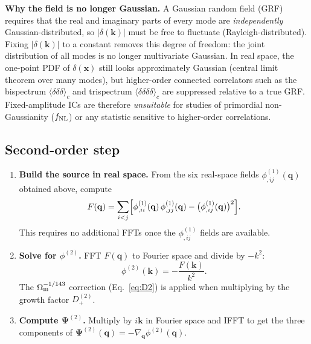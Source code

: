 \documentclass[12pt]{article}
\newcommand{\bq}{\mathbf{q}}
\newcommand{\bx}{\mathbf{x}}
\newcommand{\bk}{\mathbf{k}}
\newcommand{\bPsi}{\boldsymbol{\Psi}}
\newcommand{\Dpp}{D_+^{(2)}}
\newcommand{\Omm}{\Omega_{\rm m}}
\begin{document}
\begin{tcolorbox}
\textbf{Why the field is no longer Gaussian.}
A Gaussian random field (GRF) requires that the real and imaginary parts of
every mode are \emph{independently} Gaussian-distributed, so $|\delta(\bk)|$
must be free to fluctuate (Rayleigh-distributed).
Fixing $|\delta(\bk)|$ to a constant removes this degree of freedom:
the joint distribution of all modes is no longer multivariate Gaussian.
In real space, the one-point PDF of $\delta(\bx)$ still looks approximately
Gaussian (central limit theorem over many modes), but higher-order connected
correlators such as the bispectrum $\langle\delta\delta\delta\rangle_c$ and
trispectrum $\langle\delta\delta\delta\delta\rangle_c$ are suppressed
relative to a true GRF.
Fixed-amplitude ICs are therefore \emph{unsuitable} for studies of primordial
non-Gaussianity ($f_{\rm NL}$) or any statistic sensitive to higher-order
correlations.
\end{tcolorbox}

\subsection{Second-order step}

\begin{enumerate}
  \item \textbf{Build the source in real space.}  From the six
    real-space fields $\phi^{(1)}_{,ij}(\bq)$ obtained above,
    compute
    \begin{equation}
      F(\bq) = \sum_{i<j}
        \Bigl[\phi^{(1)}_{,ii}(\bq)\,\phi^{(1)}_{,jj}(\bq)
              - \bigl(\phi^{(1)}_{,ij}(\bq)\bigr)^2\Bigr].
      \label{eq:F_source}
    \end{equation}
    This requires no additional FFTs once the $\phi^{(1)}_{,ij}$
    fields are available.

  \item \textbf{Solve for $\phi^{(2)}$.}  FFT $F(\bq)$ to Fourier
    space and divide by $-k^2$:
    \begin{equation}
      \phi^{(2)}(\bk) = -\frac{F(\bk)}{k^2}.
      \label{eq:phi2_fourier}
    \end{equation}
    The $\Omm^{-1/143}$ correction (Eq.~\ref{eq:D2}) is applied
    when multiplying by the growth factor $\Dpp$.

  \item \textbf{Compute $\bPsi^{(2)}$.}  Multiply by $i\bk$ in
    Fourier space and IFFT to get the three components of
    $\bPsi^{(2)}(\bq) = -\nabla_\bq\phi^{(2)}(\bq)$.
\end{enumerate}
\end{document}
